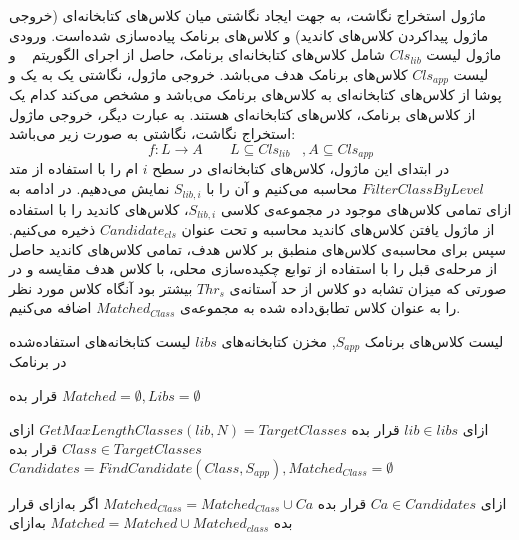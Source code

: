 ماژول استخراج نگاشت، به جهت ایجاد نگاشتی میان کلاس‌های کتابخانه‌ای (خروجی ماژول پیداکردن کلاس‌های کاندید)‌ و کلاس‌های برنامک پیاده‌سازی شده‌است. ورودی ماژول لیست $Cls_{lib}$  شامل کلاس‌های کتابخانه‌ای برنامک، حاصل از اجرای الگوریتم ~ و لیست $Cls_{app}$ کلاس‌های برنامک هدف می‌باشد. خروجی ماژول، نگاشتی یک به یک و پوشا از کلاس‌های کتابخانه‌ای به کلاس‌های برنامک می‌باشد و مشخص می‌کند کدام یک از کلاس‌های برنامک، کلاس‌های کتابخانه‌ای هستند. به عبارت دیگر، خروجی ماژول استخراج نگاشت، نگاشتی به صورت زیر می‌باشد:
  \begin{equation}
  	f: L \rightarrow A  \;\;\;\;\;\;\; L\subseteq Cls_{lib}  \;\;\; , A \subseteq Cls_{app}
  \end{equation}
در ابتدای این ماژول، کلاس‌های کتابخانه‌ای در سطح $i$ ام را با استفاده از متد $FilterClassByLevel$ محاسبه می‌کنیم و آن‌ را با $S_{lib,i}$ نمایش می‌دهیم. در ادامه به ازای تمامی کلاس‌های موجود در مجموعه‌ی کلاسی $S_{lib,i}$، کلاس‌های کاندید را با استفاده از ماژول یافتن کلاس‌های کاندید محاسبه و تحت عنوان $Candidate_{cls}$ ذخیره می‌کنیم.  سپس برای محاسبه‌ی کلاس‌های منطبق بر کلاس هدف، تمامی کلاس‌های کاندید حاصل از مرحله‌ی قبل را با استفاده از توابع چکیده‌سازی محلی، با کلاس هدف مقایسه و در صورتی که میزان تشابه دو کلاس از حد آستانه‌ی $Thr_{s}$ بیشتر بود آنگاه کلاس مورد نظر را به عنوان کلاس تطابق‌داده شده به مجموعه‌ی $Matched_{Class}$ اضافه می‌کنیم.  


  لیست کلاس‌های برنامک $S_{app}$, مخزن کتابخانه‌های $libs$
  لیست کتابخانه‌های استفاده‌شده در برنامک 

 
  قرار بده $Matched=\emptyset ,Libs = \emptyset$ 

 ‌ازای $lib \in libs$ 
 قرار بده $GetMaxLengthClasses‬‬(lib,N)‫‪ = TargetClasses$
‌ازای $Class \in TargetClasses$
 قرار بده  $Candidates = FindCandidate(Class,S_{app}), Matched_{Class} = \emptyset$   

‌ازای $Ca \in Candidates$
 قرار بده $Matched_{Class} = Matched_{Class} \cup {Ca}$
‌اگر
‌به‌ازای
 قرار بده $Matched = Matched \cup Matched_{class}$
‌به‌ازای
 

